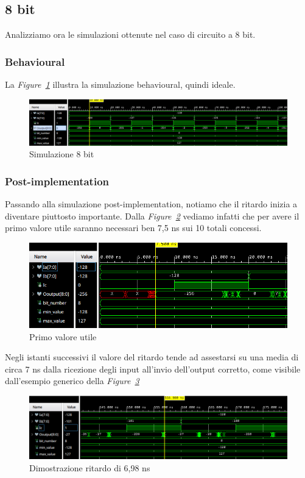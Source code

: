 \subsection{8 bit}
Analizziamo ora le simulazioni ottenute nel caso di circuito a 8 bit. 
\subsubsection{Behavioural}
La \textit{Figure~\ref{8bit_behav}} illustra la simulazione behavioural, quindi ideale.

\begin{figure}[ht]
  \centering
  \includegraphics[width=1\textwidth]{assets/simulations/behavioural/8bit/8bit_behav_sim.png}
  \caption{Simulazione 8 bit}
  \label{8bit_behav} 
\end{figure}

\subsubsection{Post-implementation}
Passando alla simulazione post-implementation, notiamo che il ritardo inizia a diventare piuttosto importante. Dalla \textit{Figure~\ref{8bit_pi_x}} vediamo infatti che per avere il primo valore utile saranno necessari 
ben 7,5 ns sui 10 totali concessi.
\begin{figure}[ht]
  \centering
  \includegraphics[width=1\textwidth]{assets/simulations/Post_Implementation/8bit/end_x.png}
  \caption{Primo valore utile}
  \label{8bit_pi_x} 
\end{figure}

Negli istanti successivi il valore del ritardo tende ad assestarsi su una media di circa 7 ns dalla ricezione degli input all'invio dell'output corretto, come visibile dall'esempio generico della \textit{Figure~\ref{random_val}}
\begin{figure}[ht]
  \centering
  \includegraphics[width=1\textwidth]{assets/simulations/Post_Implementation/8bit/random_val.png}
  \caption{Dimostrazione ritardo di 6,98 ns}
  \label{random_val} 
\end{figure}

